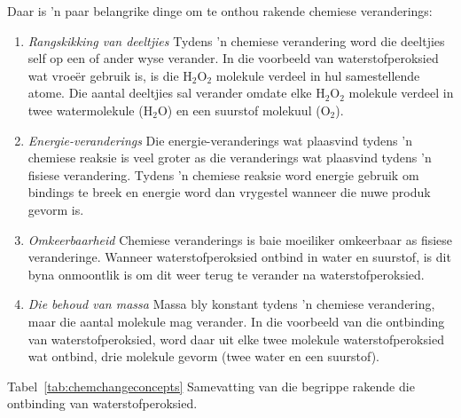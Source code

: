       \label{m38709*id62865} Daar is 'n paar belangrike dinge om te onthou rakende chemiese veranderings:\par 
      \label{m38709*id62869}\begin{enumerate}[noitemsep, label=\textbf{\arabic*}. ] 
            \label{m38709*uid6}\item \textsl{Rangskikking van deeltjies}\newline
Tydens 'n chemiese verandering word die deeltjies self op een of ander wyse verander. In die voorbeeld van waterstofperoksied wat vroe\"{e}r gebruik is, is die $\text{H}_{2}\text{O}_{2}$ molekule verdeel in hul samestellende atome. Die aantal deeltjies sal verander omdate elke $\text{H}_{2}\text{O}_{2}$ molekule verdeel in twee watermolekule ($\text{H}_{2}\text{O}$) en een suurstof molekuul ($\text{O}_{2}$).
\label{m38709*uid7}\item \textsl{Energie-veranderings}\newline
Die energie-veranderings wat plaasvind tydens 'n chemiese reaksie is veel groter as die veranderings wat plaasvind tydens 'n fisiese verandering. Tydens 'n chemiese reaksie word energie gebruik om bindings te breek en energie word dan vrygestel wanneer die nuwe produk gevorm is. 
\label{m38709*uid8}\item \textsl{Omkeerbaarheid}\newline
Chemiese veranderings is baie moeiliker omkeerbaar as fisiese veranderinge. Wanneer waterstofperoksied ontbind in water en suurstof, is dit byna onmoontlik is om dit weer terug te verander na waterstofperoksied.
\item \textsl{Die behoud van massa}\newline
Massa bly konstant tydens 'n chemiese verandering, maar die aantal molekule mag verander. In die voorbeeld van die ontbinding van waterstofperoksied, word daar uit elke twee molekule waterstofperoksied wat ontbind, drie molekule gevorm (twee water en een suurstof).
\end{enumerate}
Tabel~\ref{tab:chemchangeconcepts} Samevatting van die begrippe rakende die ontbinding van waterstofperoksied.
